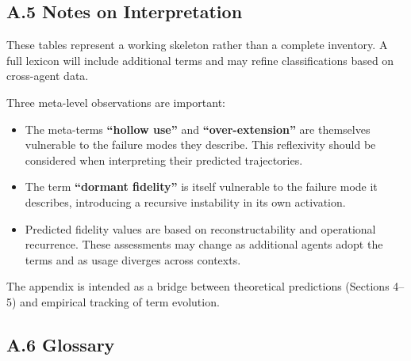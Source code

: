 \documentclass[11pt]{article}
\begin{document}
\newpage
\subsection*{A.5 Notes on Interpretation}

These tables represent a working skeleton rather than a complete inventory. A full lexicon will include additional terms and may refine classifications based on cross-agent data.

Three meta-level observations are important:

\begin{itemize}
\item The meta-terms \textbf{``hollow use''} and \textbf{``over-extension''} are themselves vulnerable to the failure modes they describe. This reflexivity should be considered when interpreting their predicted trajectories.

\item The term \textbf{``dormant fidelity''} is itself vulnerable to the failure mode it describes, introducing a recursive instability in its own activation.

\item Predicted fidelity values are based on reconstructability and operational recurrence. These assessments may change as additional agents adopt the terms and as usage diverges across contexts.
\end{itemize}

The appendix is intended as a bridge between theoretical predictions (Sections 4--5) and empirical tracking of term evolution.


\subsection*{A.6 Glossary}


\end{document}
